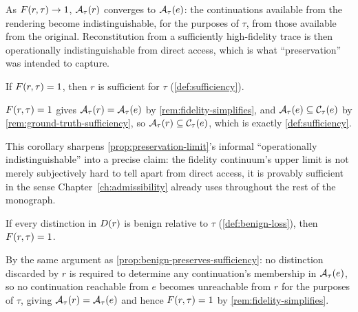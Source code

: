 \begin{proofsketch}
As $F(r,\tau) \to 1$, $\mathcal{A}_{\tau}(r)$ converges to
$\mathcal{A}_{\tau}(e)$: the continuations available from the rendering become
indistinguishable, for the purposes of $\tau$, from those available from
the original. Reconstitution from a sufficiently high-fidelity trace is
then operationally indistinguishable from direct access, which is what
``preservation'' was intended to capture.
\end{proofsketch}

\begin{corollary}
\label{cor:fidelity-implies-sufficiency}
If $F(r,\tau) = 1$, then $r$ is sufficient for $\tau$
(\cref{def:sufficiency}).
\end{corollary}

\begin{proofsketch}
$F(r,\tau)=1$ gives $\mathcal{A}_{\tau}(r) = \mathcal{A}_{\tau}(e)$ by
\cref{rem:fidelity-simplifies}, and $\mathcal{A}_{\tau}(e) \subseteq
\mathcal{C}_\tau(e)$ by \cref{rem:ground-truth-sufficiency}, so
$\mathcal{A}_{\tau}(r) \subseteq \mathcal{C}_\tau(e)$, which is exactly
\cref{def:sufficiency}.
\end{proofsketch}

This corollary sharpens \cref{prop:preservation-limit}'s informal
``operationally indistinguishable'' into a precise claim: the fidelity
continuum's upper limit is not merely subjectively hard to tell apart
from direct access, it is provably sufficient in the sense
Chapter~\ref{ch:admissibility} already uses throughout the rest of the
monograph.

\begin{proposition}
\label{prop:benign-preserves-fidelity}
If every distinction in $D(r)$ is benign relative to $\tau$
(\cref{def:benign-loss}), then $F(r,\tau) = 1$.
\end{proposition}

\begin{proofsketch}
By the same argument as \cref{prop:benign-preserves-sufficiency}: no
distinction discarded by $r$ is required to determine any continuation's
membership in $\mathcal{A}_{\tau}(e)$, so no continuation reachable from $e$
becomes unreachable from $r$ for the purposes of $\tau$, giving
$\mathcal{A}_{\tau}(r) = \mathcal{A}_{\tau}(e)$ and hence
$F(r,\tau) = 1$ by \cref{rem:fidelity-simplifies}.
\end{proofsketch}

